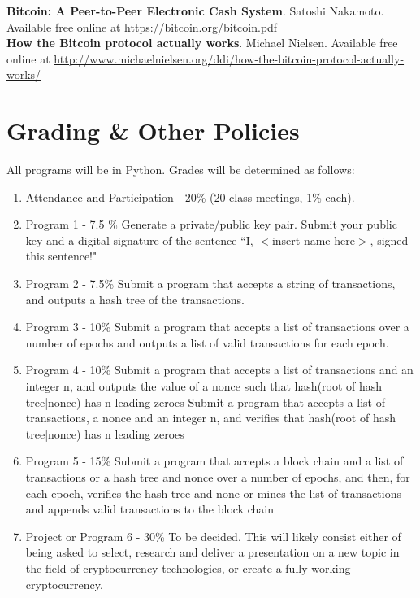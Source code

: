 \documentclass{article}
\begin{document}
\noindent \textbf{Bitcoin: A Peer-to-Peer Electronic Cash System}. Satoshi Nakamoto. Available free online at \url{https://bitcoin.org/bitcoin.pdf}\\

\noindent \textbf{How the Bitcoin protocol actually works}. Michael Nielsen. Available free online at \url{http://www.michaelnielsen.org/ddi/how-the-bitcoin-protocol-actually-works/}

\pagebreak

\section*{Grading \& Other Policies}

All programs will be in Python. Grades will be determined as follows:
\begin{enumerate}
\item Attendance and Participation - 20\% (20 class meetings, 1\% each).
\item Program 1 - 7.5 \%
\subitem Generate a private/public key pair. Submit your public key and a digital signature of the sentence ``I, $<$insert name here$>$, signed this sentence!"
\item Program 2 - 7.5\%
\subitem Submit a program that accepts a string of transactions, and outputs a hash tree of the transactions.
\item Program 3 - 10\%
\subitem Submit a program that accepts a list of transactions over a number of epochs and outputs a list of valid transactions for each epoch.
\item Program 4 - 10\% 
\subitem Submit a program that accepts a list of transactions and an integer n, and outputs the value of a nonce such that hash(root of hash tree|nonce) has n leading zeroes
\subitem Submit a program that accepts a list of transactions, a nonce and an integer n, and verifies that hash(root of hash tree|nonce) has n leading zeroes
\item Program 5 - 15\%
\subitem Submit a program that accepts a block chain and a list of transactions or a hash tree and nonce over a number of epochs, and then, for each epoch, verifies the hash tree and none or mines the list of transactions and appends valid transactions to the block chain
\item Project or Program 6 - 30\%
\subitem To be decided. This will likely consist either of being asked to select, research and deliver a presentation on a new topic in the field of cryptocurrency technologies, or create a fully-working cryptocurrency.

\end{enumerate}
\end{document}
